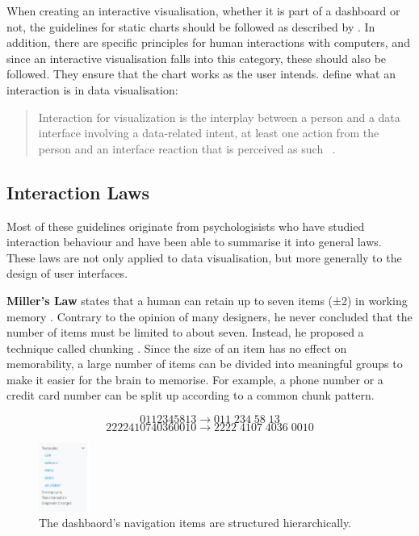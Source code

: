 \documentclass[11pt]{article}
\begin{document}
When creating an interactive visualisation, whether it is part of a dashboard or not, the guidelines for static charts should be followed as described by \textcite{weibel_fundamentals_2021}. In addition, there are specific principles for human interactions with computers, and since an interactive visualisation falls into this category, these should also be followed. They ensure that the chart works as the user intends. \textcite{dimara_what_2020} define what an interaction is in data visualisation:

\begin{quote}
    Interaction for visualization is the interplay between a person and a data interface involving a data-related intent, at least one action from the person and an interface reaction that is perceived as such ~\parencite{dimara_what_2020}.
\end{quote}

\subsection{Interaction Laws}

Most of these guidelines originate from psychologisists who have studied interaction behaviour and have been able to summarise it into general laws. These laws are not only applied to data visualisation, but more generally to the design of user interfaces. 

\textbf{Miller's Law} states that a human can retain up to seven items (±2) in working memory \parencite{miller_magical_1956}. Contrary to the opinion of many designers, he never concluded that the number of items must be limited to about seven. Instead, he proposed a technique called chunking \parencite{yablonski_millers_2020}. Since the size of an item has no effect on memorability, a large number of items can be divided into meaningful groups to make it easier for the brain to memorise. For example, a phone number or a credit card number can be split up according to a common chunk pattern.

\begin{multicols}{2}
    \noindent
    $$0112345813 \rightarrow 011\;234\;58\;13$$
    $$2222410740360010 \rightarrow 2222\;4107\;4036\;0010$$
\end{multicols}

\begin{figure}
    \includegraphics[width=0.15\textwidth]{./menu-collapsible.png}
    \caption{The dashbaord's navigation items are structured hierarchically.}
    \label{menu-collapsible}
\end{figure}
\end{document}
